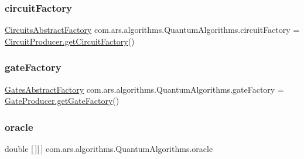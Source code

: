 \subsubsection{\texorpdfstring{circuit\+Factory}{circuitFactory}}
{\footnotesize\ttfamily \hyperlink{classcom_1_1ars_1_1circuits_1_1_circuits_abstract_factory}{Circuits\+Abstract\+Factory} com.\+ars.\+algorithms.\+Quantum\+Algorithms.\+circuit\+Factory = \hyperlink{classcom_1_1ars_1_1circuits_1_1_circuit_producer_a309e58fbb248b354abc746f9a82233eb}{Circuit\+Producer.\+get\+Circuit\+Factory}()\hspace{0.3cm}{\ttfamily [protected]}}

\hypertarget{classcom_1_1ars_1_1algorithms_1_1_quantum_algorithms_a4a69f924d80667c1a262ef0c150c0a02}{}\label{classcom_1_1ars_1_1algorithms_1_1_quantum_algorithms_a4a69f924d80667c1a262ef0c150c0a02} 
\subsubsection{\texorpdfstring{gate\+Factory}{gateFactory}}
{\footnotesize\ttfamily \hyperlink{classcom_1_1ars_1_1gates_1_1_gates_abstract_factory}{Gates\+Abstract\+Factory} com.\+ars.\+algorithms.\+Quantum\+Algorithms.\+gate\+Factory = \hyperlink{classcom_1_1ars_1_1gates_1_1_gate_producer_a643829e30db1500430781afb9bc825e9}{Gate\+Producer.\+get\+Gate\+Factory}()\hspace{0.3cm}{\ttfamily [protected]}}

\hypertarget{classcom_1_1ars_1_1algorithms_1_1_quantum_algorithms_a1dee0d926787964b9c8d3daa6355dc70}{}\label{classcom_1_1ars_1_1algorithms_1_1_quantum_algorithms_a1dee0d926787964b9c8d3daa6355dc70} 
\subsubsection{\texorpdfstring{oracle}{oracle}}
{\footnotesize\ttfamily double \mbox{[}$\,$\mbox{]}\mbox{[}$\,$\mbox{]} com.\+ars.\+algorithms.\+Quantum\+Algorithms.\+oracle\hspace{0.3cm}{\ttfamily [protected]}}

